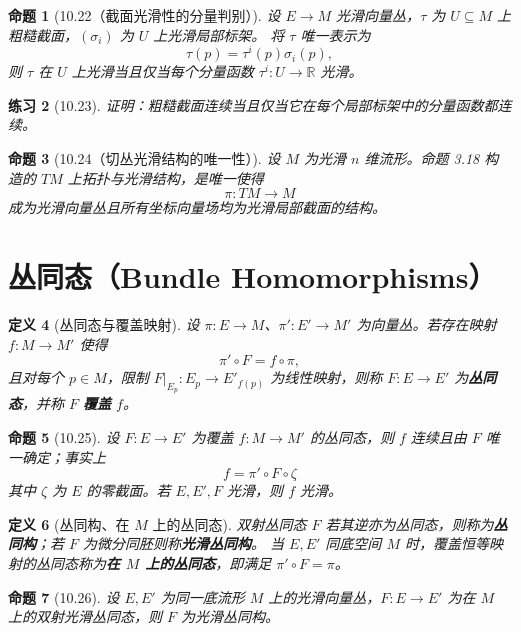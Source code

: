 \documentclass[12pt]{article}
\newtheorem{definition}{定义}[section]
\newtheorem{proposition}[definition]{命题}
\newtheorem{exercise}[definition]{练习}
\begin{document}
\begin{proposition}[10.22（截面光滑性的分量判别）]
设 $E\to M$ 光滑向量丛，$\tau$ 为 $U\subseteq M$ 上粗糙截面，$(\sigma_i)$ 为 $U$ 上光滑局部标架。
将 $\tau$ 唯一表示为
\[
\tau(p)=\tau^i(p)\sigma_i(p),
\]
则 $\tau$ 在 $U$ 上光滑当且仅当每个分量函数 $\tau^i:U\to\mathbb{R}$ 光滑。
\end{proposition}

\begin{exercise}[10.23]
证明：粗糙截面连续当且仅当它在每个局部标架中的分量函数都连续。
\end{exercise}

\begin{proposition}[10.24（切丛光滑结构的唯一性）]
设 $M$ 为光滑 $n$ 维流形。命题 3.18 构造的 $TM$ 上拓扑与光滑结构，是唯一使得
\[
\pi:TM\to M
\]
成为光滑向量丛且所有坐标向量场均为光滑局部截面的结构。
\end{proposition}

\section{丛同态（Bundle Homomorphisms）}

\begin{definition}[丛同态与覆盖映射]
设 $\pi:E\to M$、$\pi':E'\to M'$ 为向量丛。若存在映射 $f:M\to M'$ 使得
\[
\pi'\circ F=f\circ \pi,
\]
且对每个 $p\in M$，限制 $F|_{E_p}:E_p\to E'_{f(p)}$ 为线性映射，则称 $F:E\to E'$ 为\textbf{丛同态}，并称 $F$ \textbf{覆盖} $f$。
\end{definition}

\begin{proposition}[10.25]
设 $F:E\to E'$ 为覆盖 $f:M\to M'$ 的丛同态，则 $f$ 连续且由 $F$ 唯一确定；事实上
\[
f=\pi'\circ F\circ \zeta
\]
其中 $\zeta$ 为 $E$ 的零截面。若 $E,E',F$ 光滑，则 $f$ 光滑。
\end{proposition}

\begin{definition}[丛同构、在 $M$ 上的丛同态]
双射丛同态 $F$ 若其逆亦为丛同态，则称为\textbf{丛同构}；若 $F$ 为微分同胚则称\textbf{光滑丛同构}。
当 $E,E'$ 同底空间 $M$ 时，覆盖恒等映射的丛同态称为\textbf{在 $M$ 上的丛同态}，即满足 $\pi'\circ F=\pi$。
\end{definition}

\begin{proposition}[10.26]
设 $E,E'$ 为同一底流形 $M$ 上的光滑向量丛，$F:E\to E'$ 为在 $M$ 上的双射光滑丛同态，则 $F$ 为光滑丛同构。
\end{proposition}
\end{document}

